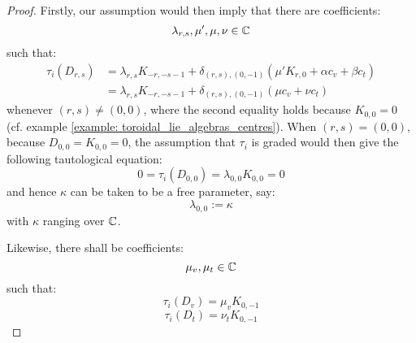             \begin{proof} 
                Firstly, our assumption would then imply that there are coefficients:
                    $$\lambda_{r, s}, \mu', \mu, \nu \in \mathbb{C}$$
                such that:
                    $$
                        \begin{aligned}
                            \tau_i(D_{r, s}) & = \lambda_{r, s} K_{-r, -s - 1} + \delta_{(r, s), (0, -1)} ( \mu' K_{r, 0} + \alpha c_v + \beta c_t )
                            \\
                            & = \lambda_{r, s} K_{-r, -s - 1} + \delta_{(r, s), (0, -1)} ( \mu c_v + \nu c_t )
                        \end{aligned}
                    $$
                whenever $(r, s) \not = (0, 0)$, where the second equality holds because $K_{0, 0} = 0$ (cf. example \ref{example: toroidal_lie_algebras_centres}). When $(r, s) = (0, 0)$, because $D_{0, 0} = K_{0, 0} = 0$, the assumption that $\tau_i$ is graded would then give the following tautological equation:
                    $$0 = \tau_i(D_{0, 0}) = \lambda_{0, 0} K_{0, 0} = 0$$
                and hence $\kappa$ can be taken to be a free parameter, say:
                    $$\lambda_{0, 0} := \kappa$$
                with $\kappa$ ranging over $\mathbb{C}$. 

               Likewise, there shall be coefficients:
                    $$\mu_v, \mu_t \in \mathbb{C}$$
                such that:
                    $$\tau_i(D_v) = \mu_v K_{0, -1}$$
                    $$\tau_i(D_t) = \nu_t K_{0, -1}$$
                

\end{proof}
